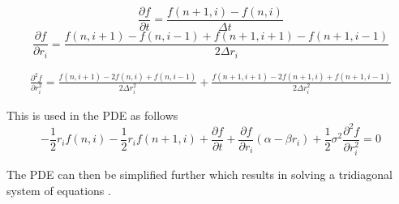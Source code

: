\documentclass[12pt,a4paper]{article}
\begin{document}
$$\frac{\partial f}{\partial t} = \frac{f(n+1,i) - f(n,i)}{\Delta t}$$
$$\frac{\partial f}{\partial r_i} = \frac{f(n,i+1) - f(n,i-1) +f(n+1,i+1) -f(n+1,i-1)}{2 \Delta r_i}$$

\begin{gather*}
\frac{\partial^2 f}{\partial r_i^2} = \frac{f(n,i+1) - 2f(n,i) + f(n,i-1)}{2\Delta r_i^2}
+ \frac{f(n+1,i+1) - 2f(n+1,i) +f(n+1,i-1)}{2\Delta r_i^2}
\end{gather*}

This is used in the PDE as follows
$$-\frac{1}{2}r_i f(n,i)-\frac{1}{2} r_i f(n+1,i) + \frac{\partial f}{\partial t} + \frac{\partial f}{\partial r_i}(\alpha - \beta r_i) +\frac{1}{2} \sigma^2 \frac{\partial^2 f}{\partial r_i^2}  = 0 $$

The PDE can then be simplified further which results in solving a tridiagonal system of equations \citep{Cairns}.
	
	
\end{document}
